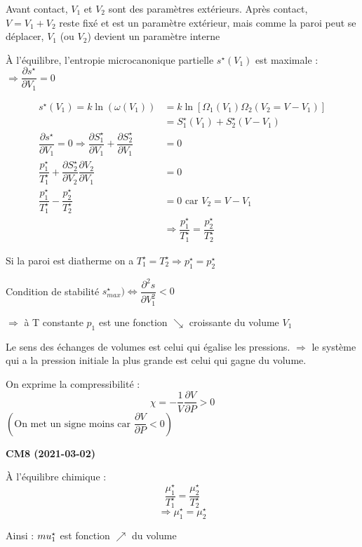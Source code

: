 \documentclass[12pt,a4paper]{report}
\begin{document}
Avant contact, \(V_1\) et \(V_2\) sont des paramètres extérieurs. Après contact, \(V = V_1 + V_2\) reste fixé et est un paramètre extérieur, mais comme la paroi peut se déplacer, \(V_1\) (ou \(V_2\)) devient un paramètre interne

À l'équilibre, l'entropie microcanonique partielle \(s^\star (V_1)\) est maximale : \(\Rightarrow \dfrac{\partial s^\star}{\partial V_1} = 0\)

\begin{align*}
	s^\star (V_1) = k \ln (\omega(V_1)) &= k \ln\left[ \Omega_1 (V_1) \Omega_2 (V_2 = V-V_1) \right]\\
	&= S_1^\star (V_1) + S_2^\star (V - V_1)\\
	\dfrac{\partial s^\star}{\partial V_1} = 0 \Rightarrow \dfrac{\partial S_1^\star}{\partial V_1} + \dfrac{\partial S_2^\star}{\partial V_1} &= 0\\
	\dfrac{p_1^\star}{T_1^\star} + \dfrac{\partial S_2^\star}{\partial V_2} \dfrac{\partial V_2}{\partial V_1} &= 0\\
	\dfrac{p_1^\star}{T_1^\star} - \dfrac{p_2^\star}{T_2^\star} &= 0 \text{ car } V_2 = V - V_1\\
	&\Rightarrow \dfrac{p_1^\star}{T_1^\star} = \dfrac{p_2^\star}{T_2^\star}
\end{align*}

Si la paroi est diatherme on a \(T_1^\star = T_2^\star \Rightarrow p^\star_1 = p^\star_2\)

Condition de stabilité \(s^\star_{max}) \Leftrightarrow \dfrac{\partial^2 s}{\partial V_1^2} < 0\)

\(\Rightarrow \) à T constante \(p_1\) est une fonction \(\searrow\) croissante du volume \(V_1\)


Le sens des échanges de volumes est celui qui égalise les pressions. \(\Rightarrow\) le système qui a la pression initiale la plus grande est celui qui gagne du volume.

On exprime la compressibilité :
\[
	\chi = - \dfrac{1}{V} \dfrac{\partial V}{\partial P} > 0
\]
\(\left( \text{On met un signe moins car } \dfrac{\partial V}{\partial P} < 0 \right)\)

\begin{center}
\textbf{CM8 (2021-03-02)}
\end{center}

À l'équilibre chimique :
\[
	\dfrac{\mu_1^\star}{T_1^\star} = \dfrac{\mu_2^\star}{T_2^\star}
\]
\[
	\Rightarrow \mu_1^\star = \mu_2^\star
\]

Ainsi : $\\mu_1^\star$ est fonction $\nearrow$ du volume
\end{document}
